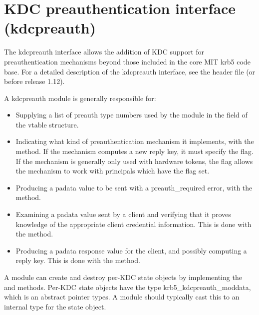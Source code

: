 \documentclass[letterpaper,10pt,english]{sphinxmanual}
\begin{document}
\section{KDC preauthentication interface (kdcpreauth)}
\label{\detokenize{plugindev/kdcpreauth:kdc-preauthentication-interface-kdcpreauth}}\label{\detokenize{plugindev/kdcpreauth::doc}}
The kdcpreauth interface allows the addition of KDC support for
preauthentication mechanisms beyond those included in the core MIT
krb5 code base.  For a detailed description of the kdcpreauth
interface, see the header file  (or
 before release 1.12).

A kdcpreauth module is generally responsible for:
\begin{itemize}
\item {} 
Supplying a list of preauth type numbers used by the module in the
 field of the vtable structure.

\item {} 
Indicating what kind of preauthentication mechanism it implements,
with the  method.  If the mechanism computes a new reply
key, it must specify the  flag.  If the mechanism
is generally only used with hardware tokens, the 
flag allows the mechanism to work with principals which have the
 flag set.

\item {} 
Producing a padata value to be sent with a preauth\_required error,
with the  method.

\item {} 
Examining a padata value sent by a client and verifying that it
proves knowledge of the appropriate client credential information.
This is done with the  method.

\item {} 
Producing a padata response value for the client, and possibly
computing a reply key.  This is done with the 
method.

\end{itemize}

A module can create and destroy per-KDC state objects by implementing
the  and  methods.  Per-KDC state objects have the
type krb5\_kdcpreauth\_moddata, which is an abstract pointer types.  A
module should typically cast this to an internal type for the state
object.
\end{document}
